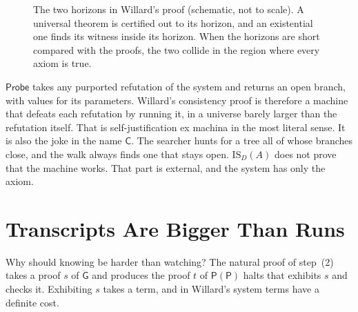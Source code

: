 \documentclass[11pt]{article}
\newcommand{\G}{\ddot{\mathsf{G}}}          %
\newcommand{\Prog}[1]{\mathsf{#1}}
\newcommand{\fs}[1]{\ifmmode\text{\guillemotleft#1\guillemotright}\else\guillemotleft#1\guillemotright\fi}
\newcommand{\ISD}{\mathrm{IS}_D(A)}
\theoremstyle{plain}
\theoremstyle{definition}
\begin{document}
\begin{figure}[tb]
\centering
{}
\caption{The two horizons in Willard's proof (schematic, not to scale). A
universal theorem is certified out to its horizon, and an existential one
finds its witness inside its horizon. When the horizons are short compared
with the proofs, the two collide in the region where every axiom is true.}
\label{fig:horizon}
\end{figure}

$\Prog{Probe}$ takes any purported refutation of the system and returns an
open branch, with values for its parameters. Willard's consistency proof is
therefore a machine that defeats each refutation by running it, in a universe
barely larger than the refutation itself. That is self-justification ex
machina in the most literal sense. It is also the joke in the name
$\Prog{C}$. The searcher hunts for a tree all of whose branches close, and the
walk always finds one that stays open. $\ISD$ does not prove that the machine
works. That part is external, and the system has only the axiom.

\section{Transcripts Are Bigger Than Runs}
\label{sec:transcripts}

Why should knowing be harder than watching? The natural proof of step~(2)
takes a proof $s$ of $\G$ and produces the proof $t$ of
\fs{$\Prog{P}(\Prog{P})$ halts} that exhibits $s$ and checks it. Exhibiting
$s$ takes a term, and in Willard's system terms have a definite cost.
\end{document}
